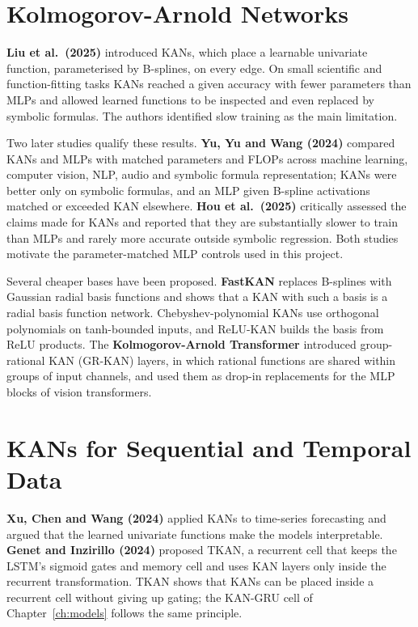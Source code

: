 \section{Kolmogorov-Arnold Networks}

\textbf{Liu et al.\ (2025)} \cite{liu2025kan} introduced KANs, which place a
learnable univariate function, parameterised by B-splines, on every edge. On
small scientific and function-fitting tasks KANs reached a given accuracy with
fewer parameters than MLPs and allowed learned functions to be inspected and
even replaced by symbolic formulas. The authors identified slow training as the
main limitation.

Two later studies qualify these results. \textbf{Yu, Yu and Wang (2024)}
\cite{yu2024} compared KANs and MLPs with matched parameters and FLOPs across
machine learning, computer vision, NLP, audio and symbolic formula
representation; KANs were better only on symbolic formulas, and an MLP given
B-spline activations matched or exceeded KAN elsewhere.
\textbf{Hou et al.\ (2025)} \cite{hou2025} critically assessed the claims made
for KANs and reported that they are substantially slower to train than MLPs and
rarely more accurate outside symbolic regression. Both studies motivate the
parameter-matched MLP controls used in this project.

Several cheaper bases have been proposed. \textbf{FastKAN} \cite{li2024fastkan}
replaces B-splines with Gaussian radial basis functions and shows that a KAN
with such a basis is a radial basis function network. Chebyshev-polynomial KANs
\cite{ss2024cheby} use orthogonal polynomials on tanh-bounded inputs, and
ReLU-KAN \cite{relukan} builds the basis from ReLU products. The
\textbf{Kolmogorov-Arnold Transformer} \cite{yang2025kat} introduced group-rational
KAN (GR-KAN) layers, in which rational functions are shared within groups of
input channels, and used them as drop-in replacements for the MLP blocks of
vision transformers.

\section{KANs for Sequential and Temporal Data}

\textbf{Xu, Chen and Wang (2024)} \cite{xu2024tskan} applied KANs to time-series
forecasting and argued that the learned univariate functions make the models
interpretable. \textbf{Genet and Inzirillo (2024)} \cite{genet2024} proposed TKAN,
a recurrent cell that keeps the LSTM's sigmoid gates and memory cell and uses KAN
layers only inside the recurrent transformation. TKAN shows that KANs can be
placed inside a recurrent cell without giving up gating; the KAN-GRU cell of
Chapter~\ref{ch:models} follows the same principle.


